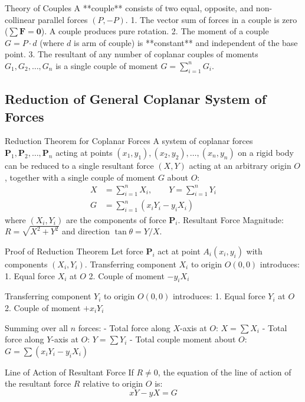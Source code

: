 \documentclass[11pt,a4paper]{article}
\begin{document}
\begin{theorembox}{Theory of Couples}
A **couple** consists of two equal, opposite, and non-collinear parallel forces $(P, -P)$.
1. The vector sum of forces in a couple is zero ($\sum \mathbf{F} = \mathbf{0}$). A couple produces pure rotation.
2. The moment of a couple $G = P \cdot d$ (where $d$ is arm of couple) is **constant** and independent of the base point.
3. The resultant of any number of coplanar couples of moments $G_1, G_2, \dots, G_n$ is a single couple of moment $G = \sum_{i=1}^n G_i$.
\end{theorembox}

\subsection{Reduction of General Coplanar System of Forces}

\begin{theorembox}{Reduction Theorem for Coplanar Forces}
A system of coplanar forces $\mathbf{P}_1, \mathbf{P}_2, \dots, \mathbf{P}_n$ acting at points $(x_1, y_1), (x_2, y_2), \dots, (x_n, y_n)$ on a rigid body can be reduced to a single resultant force $(X, Y)$ acting at an arbitrary origin $O$, together with a single couple of moment $G$ about $O$:
\begin{align}
X &= \sum_{i=1}^n X_i, \qquad Y = \sum_{i=1}^n Y_i \\
G &= \sum_{i=1}^n (x_i Y_i - y_i X_i)
\end{align}
where $(X_i, Y_i)$ are the components of force $\mathbf{P}_i$.
Resultant Force Magnitude: $R = \sqrt{X^2 + Y^2}$ and direction $\tan\theta = Y/X$.
\end{theorembox}

\begin{proofbox}{Proof of Reduction Theorem}
Let force $\mathbf{P}_i$ act at point $A_i(x_i, y_i)$ with components $(X_i, Y_i)$.
Transferring component $X_i$ to origin $O(0,0)$ introduces:
1. Equal force $X_i$ at $O$
2. Couple of moment $-y_i X_i$

Transferring component $Y_i$ to origin $O(0,0)$ introduces:
1. Equal force $Y_i$ at $O$
2. Couple of moment $+x_i Y_i$

Summing over all $n$ forces:
- Total force along $X$-axis at $O$: $X = \sum X_i$
- Total force along $Y$-axis at $O$: $Y = \sum Y_i$
- Total couple moment about $O$: $G = \sum (x_i Y_i - y_i X_i)$
\end{proofbox}

\begin{theorembox}{Line of Action of Resultant Force}
If $R \neq 0$, the equation of the line of action of the resultant force $R$ relative to origin $O$ is:
\begin{equation}
xY - yX = G
\end{equation}
\end{theorembox}
\end{document}
